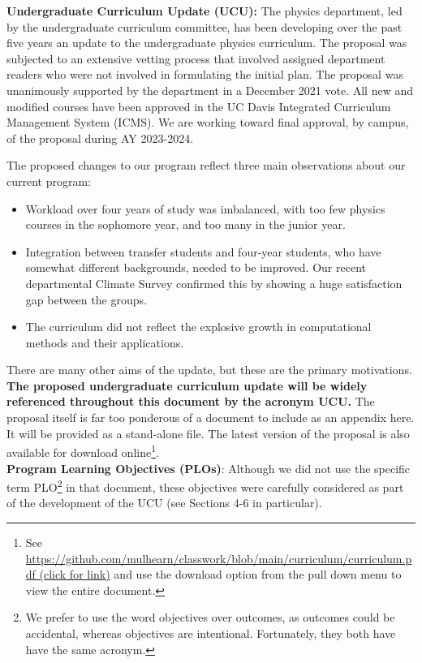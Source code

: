 \documentclass[12pt]{article}
\begin{document}
\noindent
{\bf Undergraduate Curriculum Update (UCU):}
The physics department, led by the undergraduate curriculum committee,
has been developing over the past five years an update to the
undergraduate physics curriculum.  The proposal was subjected to an
extensive vetting process that involved assigned department readers
who were not involved in formulating the initial plan.  The proposal
was unanimously supported by the department in a December 2021 vote.
All new and modified courses have been approved in the UC Davis
Integrated Curriculum Management System (ICMS).  We are working toward
final approval, by campus, of the proposal during AY 2023-2024.

The proposed changes to our program reflect three main observations
about our current program:
\begin{itemize}
 \item Workload over four years of study was imbalanced, with too few
   physics courses in the sophomore year, and too many in the junior
   year.
 \item Integration between transfer students and four-year students,
   who have somewhat different backgrounds, needed to be improved. Our
   recent departmental Climate Survey confirmed this by showing a huge
   satisfaction gap between the groups.
 \item The curriculum did not reflect the explosive growth in
   computational methods and their applications.
\end{itemize}

There are many other aims of the update, but these are the primary
motivations. {\bf The proposed undergraduate curriculum update will be widely
  referenced throughout this document by the acronym UCU.}  The
proposal itself is far too ponderous of a document to include as an
appendix here.  It will be provided as a stand-alone file.  The latest
version of the proposal is also available for download
online\footnote{ See
  \href{https://github.com/mulhearn/classwork/blob/main/curriculum/curriculum.pdf}
  {https://github.com/mulhearn/classwork/blob/main/curriculum/curriculum.pdf
    (click for link)} and use the download option from the pull down menu to view
  the entire document.  }.\\[3pt]
  
\noindent
{\bf Program Learning Objectives (PLOs)}: Although we did not use the
specific term PLO\footnote{We prefer to use the word objectives over
  outcomes, as outcomes could be accidental, whereas objectives are
  intentional.  Fortunately, they both have have the same acronym.} in
that document, these objectives were carefully considered as part of
the development of the UCU (see Sections 4-6 in particular).
\end{document}
